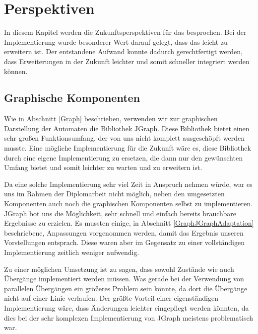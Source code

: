 



\chapter{Perspektiven}\label{Perspective}

In diesem Kapitel werden die Zukunftsperspektiven für das \gtitool besprochen.
Bei der Implementierung wurde besonderer Wert darauf gelegt, dass das \gtitool
leicht zu erweitern ist. Der entstandene Aufwand konnte dadurch gerechtfertigt
werden, dass Erweiterungen in der Zukunft leichter und somit schneller integriert
werden können.\vspace{10pt}


\section{Graphische Komponenten}\label{PerspectiveGraphics}

Wie in Abschnitt \ref{Graph} beschrieben, verwenden wir zur graphischen
Darstellung der Automaten die Bibliothek JGraph. Diese Bibliothek bietet einen
sehr großen Funktionsumfang, der von uns nicht komplett ausgeschöpft werden
musste. Eine mögliche Implementierung für die Zukunft wäre es, diese Bibliothek
durch eine eigene Implementierung zu ersetzen, die dann nur den gewünschten
Umfang bietet und somit leichter zu warten und zu erweitern ist.\vspace{10pt}

Da eine solche Implementierung sehr viel Zeit in Anspruch nehmen würde, war es
uns im Rahmen der Diplomarbeit nicht möglich, neben den umgesetzten Komponenten
auch noch die graphischen Komponenten selbst zu implementieren. JGraph bot uns
die Möglichkeit, sehr schnell und einfach bereits brauchbare Ergebnisse zu
erzielen. Es mussten einige, in Abschnitt \ref{GraphJGraphAdaptation}
beschriebene, Anpassungen vorgenommen werden, damit das Ergebnis unseren
Vorstellungen entsprach. Diese waren aber im Gegensatz zu einer vollständigen
Implementierung zeitlich weniger aufwendig.\vspace{10pt}

Zu einer möglichen Umsetzung ist zu sagen, dass sowohl Zustände wie auch
Übergänge implementiert werden müssen. Was gerade bei der Verwendung von
parallelen Übergängen ein größeres Problem sein könnte, da dort die Übergänge
nicht auf einer Linie verlaufen. Der größte Vorteil einer eigenständigen
Implementierung wäre, dass Änderungen leichter eingepflegt werden könnten, da
dies bei der sehr komplexen Implementierung von JGraph meistens problematisch
war.\vspace{10pt}

